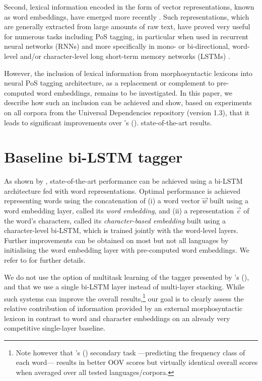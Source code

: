 \documentclass[11pt,letterpaper]{article}
\begin{document}
Second, lexical information encoded in the form of vector representations, known as word embeddings, have
emerged more recently \cite{bengio03,collobert08,chrupala13,ling15,ballesteros15,muller15}. Such representations, which
are generally extracted from large amounts of raw text, have proved very useful for numerous tasks including PoS
tagging, in particular when used in recurrent neural networks (RNNs) and more specifically in mono- or bi-directional,
word-level and/or character-level long short-term memory networks (LSTMs)
\cite{hochreiter97,ling15,ballesteros15,plank16}.

However, the inclusion of lexical information from morphosyntactic lexicons into neural PoS tagging architecture, as a
replacement or complement to pre-computed word embeddings, remains to be investigated. In this paper, we describe how
such an inclusion can be achieved and show, based on experiments on all corpora from the Universal Dependencies
repository (version 1.3), that it leads to significant improvements over \citeauthor{plank16}'s (\citeyear{plank16}).
state-of-the-art results. 


\section{Baseline bi-LSTM tagger}
\label{sec:baselinearchitecture}
As shown by \citet{plank16}, state-of-the-art performance can be achieved using a bi-LSTM architecture fed with word
representations. Optimal performance is achieved representing words using the concatenation of (i) a word vector
$\vec{w}$ built using a word embedding layer, called its {\em word embedding}, and (ii) a representation $\vec{c}$ of
the word's characters, called its {\em character-based embedding} built using a character-level bi-LSTM, which is
trained jointly with the word-level layers. Further improvements can be obtained on most but not all languages by
initialising the word embedding layer with pre-computed word embeddings. We refer to \citet{plank16} for further details.

We do not use the option of multitask learning of the tagger presented by \citeauthor{plank16}'s
(\citeyear{plank16}), and that we use a single bi-LSTM layer instead of multi-layer stacking. While such systems can
improve the overall results,\footnote{Note however that \citeauthor{plank16}'s (\citeyear{plank16})
    secondary task ---predicting the frequency class of each word--- results in better OOV scores but virtually identical
    overall scores when averaged over all tested languages/corpora.} our goal is to clearly assess the relative
contribution of information provided by an external morphosyntactic lexicon in contrast to word and character embeddings
on an already very competitive single-layer baseline.
\end{document}

